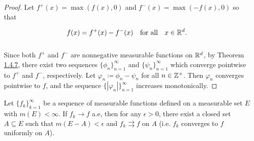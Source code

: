 \documentclass[12pt, a4paper, openany, twoside]{book}
\theoremstyle{definition}
\theoremstyle{remark}
\theoremstyle{plain}
\numberwithin{equation}{section}
\begin{document}
\begin{proof}
    Let $f^+(x)=\max(f(x),0)$ and $f^{-}(x)=\max(-f(x),0)$ so that 
    
    \[f(x)=f^+(x)-f^-(x)\quad\text{for all}\quad x\in{\mathbb {R}}^d.\]
    \\
    Since both $f^+$ and $f^-$ are nonnegative measurable functions on ${\mathbb {R}}^d$, by Theorem \hyperref[Theorem 1.4.7]{1.4.7}, there exist two sequences $\{\phi_n\}_{n=1}^{\infty}$ and $\{\psi_n\}_{n=1}^{\infty}$ which converge pointwise to $f^+$ and $f^-$, respectively. Let $\varphi_n\coloneqq\phi_n-\psi_n$ for all $n\in{\mathbb {Z}}^+$. Then $\varphi_n$ converges pointwise to $f$, and the sequence $\{|\varphi_n|\}_{n=1}^{\infty}$ increases monotonically. 
\end{proof}
\vspace{5mm}
\begin{tcolorbox}[colback=yellow!10!white,colframe=red!75!black,title=Theorem 1.4.9 (Egorov's Theorem)]\label{Theorem 1.4.9}
    Let $\{f_k\}_{k=1}^{\infty}$ be a sequence of measurable functions defined on a measurable set $E$ with $m(E)<\infty$. If $f_k\rightarrow f$ a.e, then for any $\epsilon>0$, there exist a closed set $A\subseteq E$ such that $m(E-A)<\epsilon$ and $f_k\rightrightarrows f$ on $A$ (i.e. $f_k$ converges to $f$ uniformly on $A$).
\end{tcolorbox}
\end{document}
